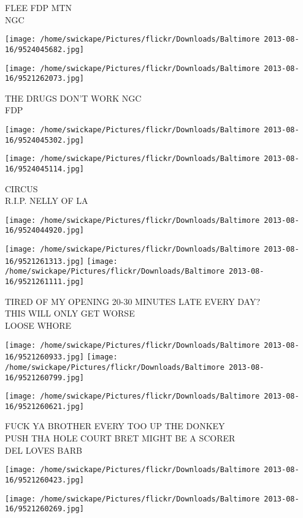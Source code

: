 \documentclass[10pt,letterpaper]{article}
\begin{document}
FLEE FDP MTN\\
NGC
\pagebreak

\texttt{[image: /home/swickape/Pictures/flickr/Downloads/Baltimore 2013-08-16/9524045682.jpg]}

\vspace{0.25in}
\texttt{[image: /home/swickape/Pictures/flickr/Downloads/Baltimore 2013-08-16/9521262073.jpg]}

THE DRUGS DON'T WORK NGC\\
FDP
\pagebreak

\texttt{[image: /home/swickape/Pictures/flickr/Downloads/Baltimore 2013-08-16/9524045302.jpg]}

\vspace{0.25in}
\texttt{[image: /home/swickape/Pictures/flickr/Downloads/Baltimore 2013-08-16/9524045114.jpg]}

CIRCUS\\
R.I.P. NELLY OF LA
\pagebreak

\texttt{[image: /home/swickape/Pictures/flickr/Downloads/Baltimore 2013-08-16/9524044920.jpg]}

\vspace{0.25in}
\texttt{[image: /home/swickape/Pictures/flickr/Downloads/Baltimore 2013-08-16/9521261313.jpg]}
\texttt{[image: /home/swickape/Pictures/flickr/Downloads/Baltimore 2013-08-16/9521261111.jpg]}

TIRED OF MY OPENING 20{-}30 MINUTES LATE EVERY DAY?\\
THIS WILL ONLY GET WORSE\\
LOOSE WHORE
\pagebreak

\texttt{[image: /home/swickape/Pictures/flickr/Downloads/Baltimore 2013-08-16/9521260933.jpg]}
\texttt{[image: /home/swickape/Pictures/flickr/Downloads/Baltimore 2013-08-16/9521260799.jpg]}

\texttt{[image: /home/swickape/Pictures/flickr/Downloads/Baltimore 2013-08-16/9521260621.jpg]}

FUCK YA BROTHER EVERY TOO UP THE DONKEY\\
PUSH THA HOLE COURT BRET MIGHT BE A SCORER\\
DEL LOVES BARB
\pagebreak

\texttt{[image: /home/swickape/Pictures/flickr/Downloads/Baltimore 2013-08-16/9521260423.jpg]}

\vspace{0.25in}
\texttt{[image: /home/swickape/Pictures/flickr/Downloads/Baltimore 2013-08-16/9521260269.jpg]}
\end{document}
